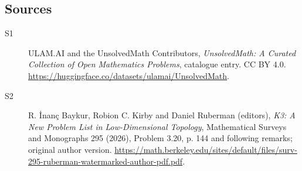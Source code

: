 \documentclass[11pt]{article}
\begin{document}
\subsection{Sources}
\begin{description}
\item[\hypertarget{source:statement:1}{S1}] ULAM.AI and the UnsolvedMath Contributors, \emph{UnsolvedMath: A Curated Collection of Open Mathematics Problems}, catalogue entry. CC BY 4.0. \url{https://huggingface.co/datasets/ulamai/UnsolvedMath}.
\item[\hypertarget{source:statement:2}{S2}] R. İnanç Baykur, Robion C. Kirby and Daniel Ruberman (editors), \emph{K3: A New Problem List in Low-Dimensional Topology}, Mathematical Surveys and Monographs 295 (2026), Problem 3.20, p. 144 and following remarks; original author version. \url{https://math.berkeley.edu/sites/default/files/surv-295-ruberman-watermarked-author-pdf.pdf}.
\end{description}
\label{end:statement}
\end{document}
